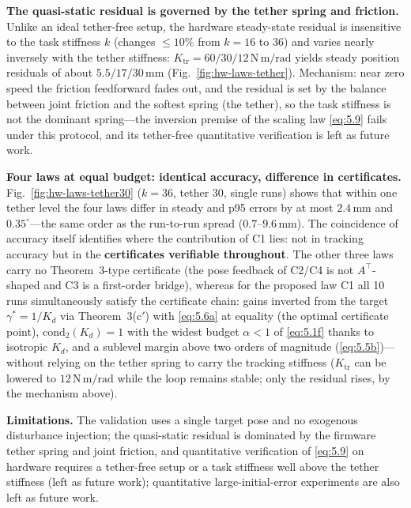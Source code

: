 \textbf{The quasi-static residual is governed by the tether spring and friction.} Unlike an ideal tether-free setup, the hardware steady-state residual is insensitive to the task stiffness $k$ (changes $\le10\%$ from $k{=}16$ to $36$) and varies nearly inversely with the tether stiffness: $K_{\mathrm{tr}}=60/30/12\,\mathrm{N\,m/rad}$ yields steady position residuals of about $5.5/17/30\,\mathrm{mm}$ (Fig.~\ref{fig:hw-laws-tether}). Mechanism: near zero speed the friction feedforward fades out, and the residual is set by the balance between joint friction and the softest spring (the tether), so the task stiffness is not the dominant spring---the inversion premise of the scaling law \eqref{eq:5.9} fails under this protocol, and its tether-free quantitative verification is left as future work.

\textbf{Four laws at equal budget: identical accuracy, difference in certificates.} Fig.~\ref{fig:hw-laws-tether30} ($k{=}36$, tether $30$, single runs) shows that within one tether level the four laws differ in steady and p95 errors by at most $2.4\,\mathrm{mm}$ and $0.35^{\circ}$---the same order as the run-to-run spread ($0.7$--$9.6\,\mathrm{mm}$). The coincidence of accuracy itself identifies where the contribution of C1 lies: not in tracking accuracy but in the \textbf{certificates verifiable throughout}. The other three laws carry no Theorem~3-type certificate (the pose feedback of C2/C4 is not $A^\top$-shaped and C3 is a first-order bridge), whereas for the proposed law C1 all 10 runs simultaneously satisfy the certificate chain: gains inverted from the target $\gamma^{*}=1/K_d$ via Theorem~3(c$'$) with \eqref{eq:5.6a} at equality (the optimal certificate point), $\mathrm{cond}_2(K_d)=1$ with the widest budget $\alpha<1$ of \eqref{eq:5.1f} thanks to isotropic $K_d$, and a sublevel margin above two orders of magnitude (\eqref{eq:5.5b})---without relying on the tether spring to carry the tracking stiffness ($K_{\mathrm{tr}}$ can be lowered to $12\,\mathrm{N\,m/rad}$ while the loop remains stable; only the residual rises, by the mechanism above).

\textbf{Limitations.} The validation uses a single target pose and no exogenous disturbance injection; the quasi-static residual is dominated by the firmware tether spring and joint friction, and quantitative verification of \eqref{eq:5.9} on hardware requires a tether-free setup or a task stiffness well above the tether stiffness (left as future work); quantitative large-initial-error experiments are also left as future work.

